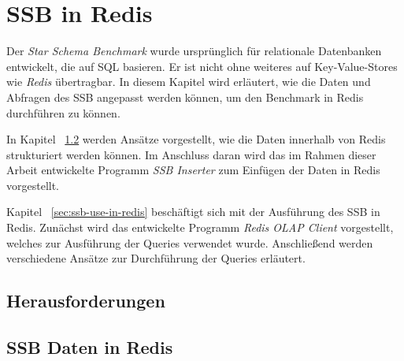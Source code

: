 \chapter{SSB in Redis}
Der \emph{Star Schema Benchmark} wurde ursprünglich für relationale Datenbanken entwickelt, die auf SQL basieren. Er ist nicht ohne weiteres auf Key-Value-Stores wie \emph{Redis} übertragbar. In diesem Kapitel wird erläutert, wie die Daten und Abfragen des SSB angepasst werden können, um den Benchmark in Redis durchführen zu können.

In Kapitel ~\ref{sec:ssb-data-in-redis} werden Ansätze vorgestellt, wie die Daten innerhalb von Redis strukturiert werden können. Im Anschluss daran wird das im Rahmen dieser Arbeit entwickelte Programm \emph{SSB Inserter} zum Einfügen der Daten in Redis vorgestellt.


Kapitel ~\ref{sec:ssb-use-in-redis} beschäftigt sich mit der Ausführung des SSB in Redis.
Zunächst wird das entwickelte Programm \emph{Redis OLAP Client} vorgestellt, welches zur Ausführung der Queries verwendet wurde. Anschließend werden verschiedene Ansätze zur Durchführung der Queries erläutert.

\section{Herausforderungen}

\section{SSB Daten in Redis}\label{sec:ssb-data-in-redis}

